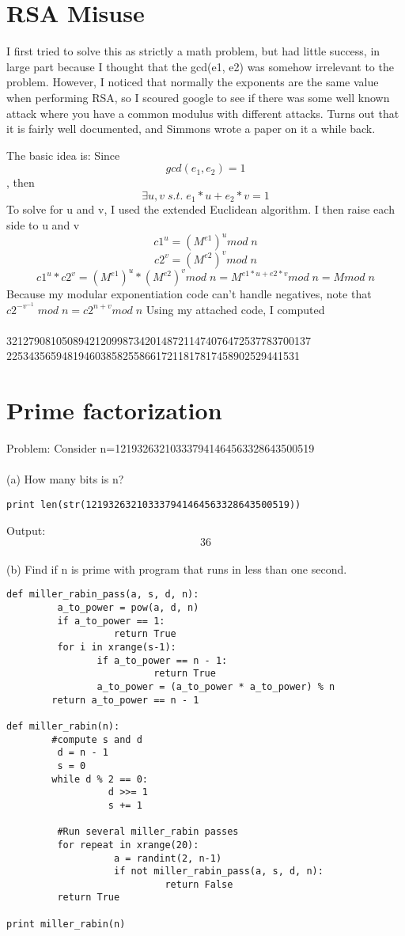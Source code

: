 \documentclass[12pt]{article}
\begin{document}
\section{RSA Misuse}

I first tried to solve this as strictly a math problem, but had little success, in large part because I thought that
the gcd(e1, e2) was somehow irrelevant to the problem. However, I noticed that normally the exponents are the same value
when performing RSA, so I scoured google to see if there was some well known attack where you have a common modulus with
different attacks. Turns out that it is fairly well documented, and Simmons wrote a paper on it a while back.

The basic idea is:
Since \[gcd(e_1,e_2) = 1\],
then \[\exists u, v   \;  s.t.   \;  e_1*u + e_2*v = 1\]
To solve for u and v, I used the extended Euclidean algorithm.
I then raise each side to u and v
\[c1^u = (M^{e1})^{u} mod \; n\]
\[c2^v = (M^{e2})^{v} mod \; n\]
\[c1^u * c2^v =  (M^{e1})^{u}*(M^{e2})^{v} mod \; n =  M^{e1*u + e2*v} mod \; n = M mod \; n\]
Because my modular exponentiation code can't handle negatives, note that $c2^{-v^{-1}} \; mod \; n = c2^{n+v} mod \; n$
Using my attached code, I computed
\\\\3212790810508942120998734201487211474076472537783700137\\
22534356594819460385825586617211817817458902529441531

\section{Prime factorization}

Problem: Consider n=121932632103337941464563328643500519
\\\\(a) How many bits is n?
\begin{verbatim}
print len(str(121932632103337941464563328643500519))
\end{verbatim}
Output:  \[\boxed{36}\] 
\\(b) Find if n is prime with program that runs in less than one second.
\begin{verbatim}
def miller_rabin_pass(a, s, d, n):
         a_to_power = pow(a, d, n)
         if a_to_power == 1:
                   return True
         for i in xrange(s-1):
                if a_to_power == n - 1:
                          return True
                a_to_power = (a_to_power * a_to_power) % n
        return a_to_power == n - 1

def miller_rabin(n):
        #compute s and d
         d = n - 1
         s = 0
        while d % 2 == 0:
                  d >>= 1
                  s += 1

         #Run several miller_rabin passes
         for repeat in xrange(20):
                   a = randint(2, n-1)
                   if not miller_rabin_pass(a, s, d, n):
                            return False
         return True

print miller_rabin(n)

\end{verbatim}
\end{document}

